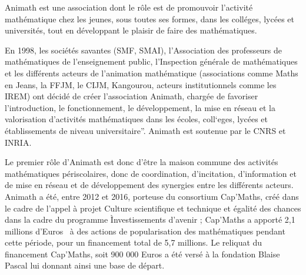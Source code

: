 Animath est une association dont le r\^ole est de promouvoir l’activit\'e math\'ematique chez les jeunes, sous toutes ses
formes, dans les coll\'eges, lyc\'ees et universit\'es, tout en d\'eveloppant le plaisir de faire des math\'ematiques. 

En 1998, les soci\'et\'es savantes (SMF, SMAI), l’Association des professeurs de math\'ematiques de l’enseignement public, l’Inspection g\'en\'erale de math\'ematiques et les diff\'erents acteurs de l’animation math\'ematique (associations comme Maths en Jeans, la FFJM, le CIJM, Kangourou, acteurs institutionnels comme les IREM) ont d\'ecid\'e de cr\'eer l’association Animath, charg\'ee de \og favoriser \fg{} l’introduction, le fonctionnement, le 
d\'eveloppement, la mise en r\'eseau et la valorisation d’activit\'es math\'ematiques dans les \'ecoles, coll`eges, lyc\'ees et \'etablissements de niveau universitaire”. Animath est soutenue par le CNRS et INRIA.

Le premier r\^ole d’Animath est donc d'\^etre la \og maison commune\fg{} des activit\'es math\'ematiques p\'eriscolaires, donc de coordination, d’incitation, d'information et de mise en r\'eseau et de d\'eveloppement des synergies 
entre les diff\'erents acteurs.  Animath a \'et\'e, entre 2012 et 2016, porteuse du consortium Cap’Maths, 
cr\'e\'e dans le cadre de l’appel \`a projet \og Culture scientifique et technique et \'egalit\'e des chances\fg{} dans la cadre du programme \og Ìnvestissements d'avenir\fg{} ; Cap'Maths a apport\'e 2,1 millions d'Euros \ \`a des actions de popularisation des math\'ematiques pendant cette p\'eriode, pour un financement total de 5,7 millions. Le reliquat du financement 
Cap'Maths, soit 900 000 Euros a \'et\'e vers\'e \`a la fondation Blaise Pascal lui donnant ainsi une base de d\'epart. 

